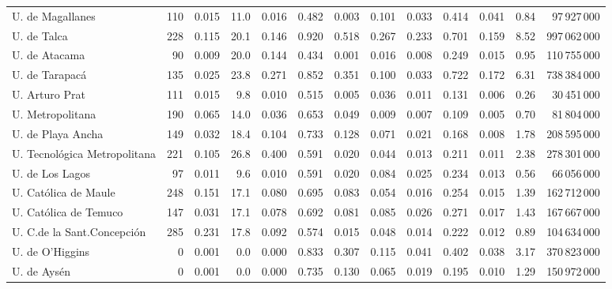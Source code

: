 \documentclass[twocolumn]{article}
\begin{document}
\begin{table}
\begin{tabular}{l rrrrrrrrrr rr}
U. de Magallanes            & 110 & 0.015 & 11.0 & 0.016 & 0.482 & 0.003 & 0.101 & 0.033 & 0.414 & 0.041 &  0.84 &     97\,927\,000\\
U. de Talca	                & 228 & 0.115 & 20.1 & 0.146 & 0.920 & 0.518 & 0.267 & 0.233 & 0.701 & 0.159 &  8.52 &    997\,062\,000\\
U. de Atacama               &  90 & 0.009 & 20.0 & 0.144 & 0.434 & 0.001 & 0.016 & 0.008 & 0.249 & 0.015 &  0.95 &    110\,755\,000\\
U. de Tarapacá              & 135 & 0.025 & 23.8 & 0.271 & 0.852 & 0.351 & 0.100 & 0.033 & 0.722 & 0.172 &  6.31 &    738\,384\,000\\
U. Arturo Prat              & 111 & 0.015 &  9.8 & 0.010 & 0.515 & 0.005 & 0.036 & 0.011 & 0.131 & 0.006 &  0.26 &     30\,451\,000\\
U. Metropolitana            & 190 & 0.065 & 14.0 & 0.036 & 0.653 & 0.049 & 0.009 & 0.007 & 0.109 & 0.005 &  0.70 &     81\,804\,000\\
U. de Playa Ancha           & 149 & 0.032 & 18.4 & 0.104 & 0.733 & 0.128 & 0.071 & 0.021 & 0.168 & 0.008 &  1.78 &    208\,595\,000\\
U. Tecnológica Metropolitana&221  & 0.105 & 26.8 & 0.400 & 0.591 & 0.020 & 0.044 & 0.013 & 0.211 & 0.011 &  2.38 &    278\,301\,000\\
U. de Los Lagos             &  97 & 0.011 &  9.6 & 0.010 & 0.591 & 0.020 & 0.084 & 0.025 & 0.234 & 0.013 &  0.56 &     66\,056\,000\\
U. Católica de Maule        & 248 & 0.151 & 17.1 & 0.080 & 0.695 & 0.083 & 0.054 & 0.016 & 0.254 & 0.015 &  1.39 &    162\,712\,000\\
U. Católica de Temuco       & 147 & 0.031 & 17.1 & 0.078 & 0.692 & 0.081 & 0.085 & 0.026 & 0.271 & 0.017 &  1.43 &    167\,667\,000\\
U. C.de la Sant.Concepción  & 285 & 0.231 & 17.8 & 0.092 & 0.574 & 0.015 & 0.048 & 0.014 & 0.222 & 0.012 &  0.89 &    104\,634\,000\\
U. de O'Higgins	            &   0 & 0.001 &  0.0 & 0.000 & 0.833 & 0.307 & 0.115 & 0.041 & 0.402 & 0.038 &  3.17 &    370\,823\,000\\
U. de Aysén                 &   0 & 0.001 &  0.0 & 0.000 & 0.735 & 0.130 & 0.065 & 0.019 & 0.195 & 0.010 &  1.29 &    150\,972\,000\\
\hline
\end{tabular}
\end{table}
\end{document}
